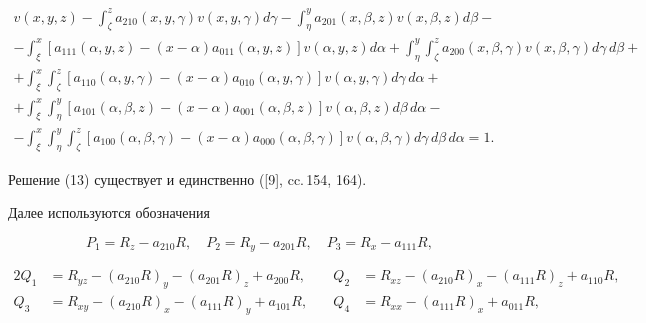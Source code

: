 \begin{multline}


v(x,y,z)-\int_{\zeta}^{z} a_{210}(x,y,\gamma)v(x,y,\gamma) d\gamma


-\int_{\eta}^{y} a_{201}(x,\beta,z)v(x,\beta,z) d\beta- \\


%


-\int_{\xi}^{x} [a_{111}(\alpha,y,z)-(x-\alpha)a_{011}(\alpha,y,z)]


v(\alpha,y,z) d\alpha+ 


\int_{\eta}^{y} \int_{\zeta}^{z} a_{200}(x,\beta,\gamma)


v(x,\beta,\gamma) d\gamma\, d\beta+\\


%


+\int_{\xi}^{x} \int_{\zeta}^{z} [a_{110}(\alpha,y,\gamma)


-(x-\alpha)a_{010}(\alpha,y,\gamma)]v(\alpha,y,\gamma) d\gamma\, d\alpha+\\


%


+\int_{\xi}^{x} \int_{\eta}^{y} [a_{101}(\alpha,\beta,z)


-(x-\alpha)a_{001}(\alpha,\beta,z)]v(\alpha,\beta,z) d\beta\, d\alpha- \\


%


-\int_{\xi}^{x} \int_{\eta}^{y} \int_{\zeta}^{z}


[a_{100}(\alpha,\beta,\gamma)


-(x-\alpha)a_{000}(\alpha,\beta,\gamma)]v(\alpha,\beta,\gamma)


d\gamma\, d\beta\, d\alpha=1.


\end{multline}


Решение (13) существует и единственно ([9], cc.\,154, 164).





Далее используются обозначения


$$


P_{1}=R_{z}-a_{210}R,\quad P_{2}=R_{y}-a_{201}R,\quad


P_{3}=R_{x}-a_{111}R, 


$$


\begin{alignat*}{2}


Q_{1}&=R_{yz}-(a_{210}R)_{y}-(a_{201}R)_{z}+a_{200}R, &\quad


Q_{2}&=R_{xz}-(a_{210}R)_{x}-(a_{111}R)_{z}+a_{110}R, \\


%


Q_{3}&=R_{xy}-(a_{210}R)_{x}-(a_{111}R)_{y}+a_{101}R, &\quad


%


Q_{4}&=R_{xx}-(a_{111}R)_{x}+a_{011}R, 


\end{alignat*}


